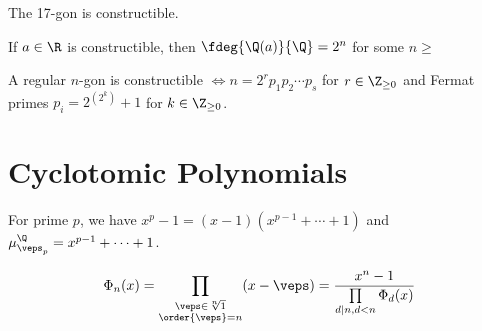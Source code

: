 \documentclass{article}
\begin{document}
\begin{tcorollary}
  The 17-gon is constructible.
\end{tcorollary}

\begin{tcorollary}
  If \( a\in\R \) is constructible, then \( \fdeg{\Q(a)}{\Q}=2^n \) for some \( n\geq  \)
\end{tcorollary}



\begin{ttheorem}
  A regular \( n \)-gon is constructible \( \iff n=2^r p_1p_2\cdots p_s \) for \( r\in\Z_{\geq 0} \) and Fermat primes \( p_i = 2^{\left( 2^k \right)}+1 \) for \( k\in \Z_{\geq 0} \).
\end{ttheorem}




\section{Cyclotomic Polynomials}

\begin{ttheorem}
  For prime \( p \), we have \( x^p-1 = (x-1)(x^{p-1} + \cdots + 1) \) and \( \mu_{\veps_p}^\Q = x^{p-1} + \cdots + 1 \).
\end{ttheorem}

\begin{tdefinition}
  \begin{align*}
    \Phi_n(x) = \prod_{\substack{\veps\in\sqrt[n]1\\\order{\veps}=n}} (x-\veps) = \frac{x^n-1}{\prod\limits_{\substack{d\mid n,d<n}}\Phi_d(x)}
  \end{align*}
\end{tdefinition}
\end{document}
